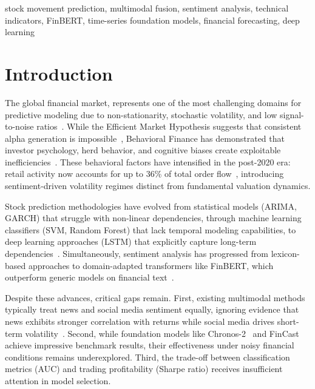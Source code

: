 \documentclass[a4paper,10pt,conference]{IEEEtran}
\begin{document}
\begin{IEEEkeywords}
stock movement prediction, multimodal fusion, sentiment analysis, technical indicators, FinBERT, time-series foundation models, financial forecasting, deep learning
\end{IEEEkeywords}

\section{Introduction}

The global financial market, 
represents one of the most challenging domains for predictive modeling due to non-stationarity, stochastic volatility, and low signal-to-noise ratios~\cite{stibel_2009}. While the Efficient Market Hypothesis suggests that consistent alpha generation is impossible~\cite{fama_1970}, Behavioral Finance has demonstrated that investor psychology, herd behavior, and cognitive biases create exploitable inefficiencies~\cite{kahneman_1979}. These behavioral factors have intensified in the post-2020 era: retail activity now accounts for up to 36\% of total order flow~\cite{jpmorgan_2025}, introducing sentiment-driven volatility regimes distinct from fundamental valuation dynamics.

Stock prediction methodologies have evolved from statistical models (ARIMA, GARCH) that struggle with non-linear dependencies, through machine learning classifiers (SVM, Random Forest) that lack temporal modeling capabilities, to deep learning approaches (LSTM) that explicitly capture long-term dependencies~\cite{hochreiter_1997, hassouni_2024}. Simultaneously, sentiment analysis has progressed from lexicon-based approaches to domain-adapted transformers like FinBERT, which outperform generic models on financial text~\cite{araci_2019, huang_2022}.

Despite these advances, critical gaps remain. First, existing multimodal methods typically treat news and social media sentiment equally, ignoring evidence that news exhibits stronger correlation with returns while social media drives short-term volatility~\cite{nyakurukwa2024}. Second, while foundation models like Chronos-2~\cite{ansari2025chronos} and FinCast~\cite{zhu2025fincast} achieve impressive benchmark results, their effectiveness under noisy financial conditions remains underexplored. Third, the trade-off between classification metrics (AUC) and trading profitability (Sharpe ratio) receives insufficient attention in model selection.
\end{document}
